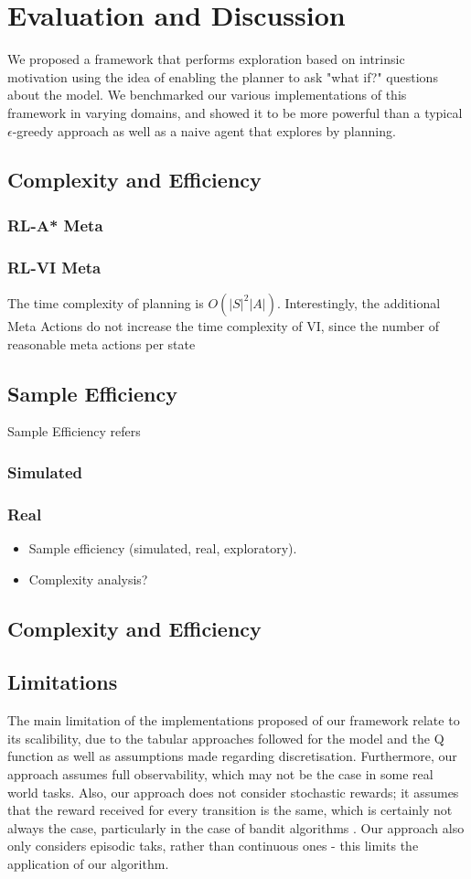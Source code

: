 \chapter{Evaluation and Discussion}
\label{chapter6}
We proposed a framework that performs exploration based on intrinsic motivation using the idea of enabling the planner to ask "what if?" questions about the model. We benchmarked our various implementations of this framework in varying domains, and showed it to be more powerful than a typical $\epsilon$-greedy approach as well as a naive agent that explores by planning.


\section{Complexity and Efficiency}
\subsection{RL-A* Meta}
\subsection{RL-VI Meta}
The time complexity of planning is $O(|S|^2|A|)$. Interestingly, the additional Meta Actions do not increase the time complexity of VI, since the number of reasonable meta actions per state 

\section{Sample Efficiency}
Sample Efficiency refers 
\subsection{Simulated}
\subsection{Real}
\begin{itemize}
    \item Sample efficiency (simulated, real, exploratory).
    \item Complexity analysis?
\end{itemize}
\section{Complexity and Efficiency}
\section{Limitations}
The main limitation of the implementations proposed of our framework relate to its scalibility, due to the tabular approaches followed for the model and the Q function as well as assumptions made regarding discretisation. Furthermore, our approach assumes full observability, which may not be the case in some real world tasks. Also, our approach does not consider stochastic rewards; it assumes that the reward received for every transition is the same, which is certainly not always the case, particularly in the case of bandit algorithms \citep{lattimore}. Our approach also only considers episodic taks, rather than continuous ones - this limits the application of our algorithm.
